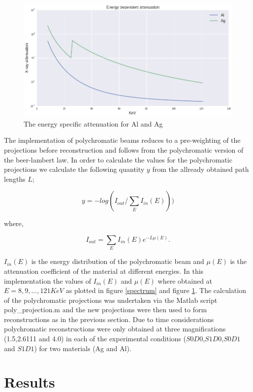 \documentclass[
  twoside,
  11pt, a4paper,
  footinclude=true,
  headinclude=true,
  cleardoublepage=empty
]{scrbook}
\begin{document}
\begin{figure}[h!]
  \centering
    \includegraphics[width=\textwidth]{code/Polychromatic/Spectrum_Atenuation_Plots_files/Spectrum_Atenuation_Plots_2_0.png}
    \caption{The energy specific attenuation for Al and Ag}
    \label{mu}
\end{figure}


The implementation of polychromatic beams reduces to a pre-weighting of the projections before reconstruction and follows from the polychromatic version of the beer-lambert law. In order to calculate the values for the polychromatic projections we calculate the following quantity $y$ from the allready obtained path lengths $L$;

\[
y = -log(I_{out}/\sum_E I_{in}(E)))
\]

where,

\[
I_{out} = \sum_E I_{in}(E) e^{-L \mu(E)}.
\]

$I_{in}(E)$ is the energy distribution of the polychromatic beam and $\mu(E)$ is the attenuation coefficient of the material at different energies. In this implementation the values of $I_{in}(E)$ and $\mu(E)$ where obtained at $E = 8,9,\ldots,121 KeV$ as plotted in figure \ref{spectrum} and figure \ref{mu}. The calculation of the polychromatic projections was undertaken via the Matlab script poly\_projection.m and the new projections were then used to form reconstructions as in the previous section. Due to time considerations polychromatic reconstructions were only obtained at three magnifications (1.5,2.6111 and 4.0) in each of the experimental conditions ($S0D0$,$S1D0$,$S0D1$ and $S1D1$) for two materials (Ag and Al).

\chapter{Results}
\end{document}
